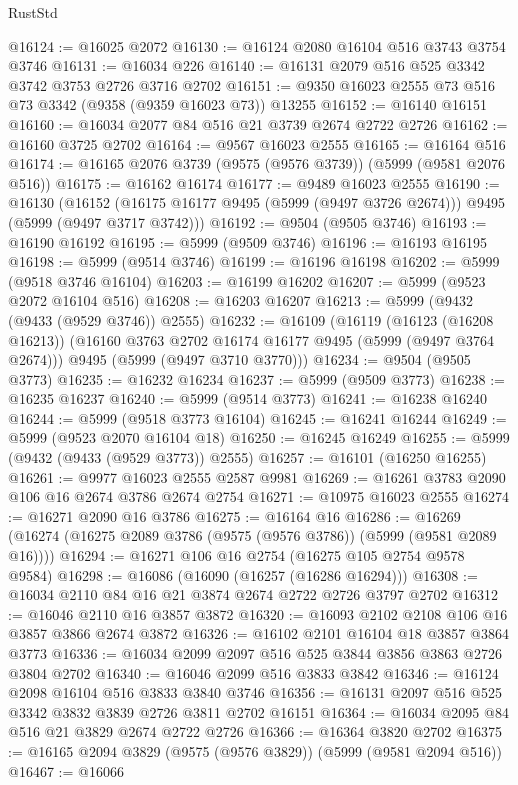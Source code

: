 \begin{lexlean}{RustStd}
\begin{coremodule}
@16124 := @16025 @2072
@16130 := @16124 @2080 @16104 @516 @3743 @3754 @3746
@16131 := @16034 @226
@16140 := @16131 @2079 @516 @525 @3342 @3742 @3753 @2726 @3716 @2702
@16151 := @9350 @16023 @2555 @73 @516 @73 @3342 (@9358 (@9359 @16023 @73)) @13255
@16152 := @16140 @16151
@16160 := @16034 @2077 @84 @516 @21 @3739 @2674 @2722 @2726
@16162 := @16160 @3725 @2702
@16164 := @9567 @16023 @2555
@16165 := @16164 @516
@16174 := @16165 @2076 @3739 (@9575 (@9576 @3739)) (@5999 (@9581 @2076 @516))
@16175 := @16162 @16174
@16177 := @9489 @16023 @2555
@16190 := @16130
    (@16152 (@16175 @16177 @9495 (@5999 (@9497 @3726 @2674))) @9495 (@5999 (@9497 @3717 @3742)))
@16192 := @9504 (@9505 @3746)
@16193 := @16190 @16192
@16195 := @5999 (@9509 @3746)
@16196 := @16193 @16195
@16198 := @5999 (@9514 @3746)
@16199 := @16196 @16198
@16202 := @5999 (@9518 @3746 @16104)
@16203 := @16199 @16202
@16207 := @5999 (@9523 @2072 @16104 @516)
@16208 := @16203 @16207
@16213 := @5999 (@9432 (@9433 (@9529 @3746)) @2555)
@16232 := @16109
    (@16119
      (@16123 (@16208 @16213))
      (@16160 @3763 @2702 @16174 @16177 @9495 (@5999 (@9497 @3764 @2674)))
      @9495
      (@5999 (@9497 @3710 @3770)))
@16234 := @9504 (@9505 @3773)
@16235 := @16232 @16234
@16237 := @5999 (@9509 @3773)
@16238 := @16235 @16237
@16240 := @5999 (@9514 @3773)
@16241 := @16238 @16240
@16244 := @5999 (@9518 @3773 @16104)
@16245 := @16241 @16244
@16249 := @5999 (@9523 @2070 @16104 @18)
@16250 := @16245 @16249
@16255 := @5999 (@9432 (@9433 (@9529 @3773)) @2555)
@16257 := @16101 (@16250 @16255)
@16261 := @9977 @16023 @2555 @2587 @9981
@16269 := @16261 @3783 @2090 @106 @16 @2674 @3786 @2674 @2754
@16271 := @10975 @16023 @2555
@16274 := @16271 @2090 @16 @3786
@16275 := @16164 @16
@16286 := @16269 (@16274 (@16275 @2089 @3786 (@9575 (@9576 @3786)) (@5999 (@9581 @2089 @16))))
@16294 := @16271 @106 @16 @2754 (@16275 @105 @2754 @9578 @9584)
@16298 := @16086 (@16090 (@16257 (@16286 @16294)))
@16308 := @16034 @2110 @84 @16 @21 @3874 @2674 @2722 @2726 @3797 @2702
@16312 := @16046 @2110 @16 @3857 @3872
@16320 := @16093 @2102 @2108 @106 @16 @3857 @3866 @2674 @3872
@16326 := @16102 @2101 @16104 @18 @3857 @3864 @3773
@16336 := @16034 @2099 @2097 @516 @525 @3844 @3856 @3863 @2726 @3804 @2702
@16340 := @16046 @2099 @516 @3833 @3842
@16346 := @16124 @2098 @16104 @516 @3833 @3840 @3746
@16356 := @16131 @2097 @516 @525 @3342 @3832 @3839 @2726 @3811 @2702 @16151
@16364 := @16034 @2095 @84 @516 @21 @3829 @2674 @2722 @2726
@16366 := @16364 @3820 @2702
@16375 := @16165 @2094 @3829 (@9575 (@9576 @3829)) (@5999 (@9581 @2094 @516))
@16467 := @16066

\end{coremodule}
\end{lexlean}
